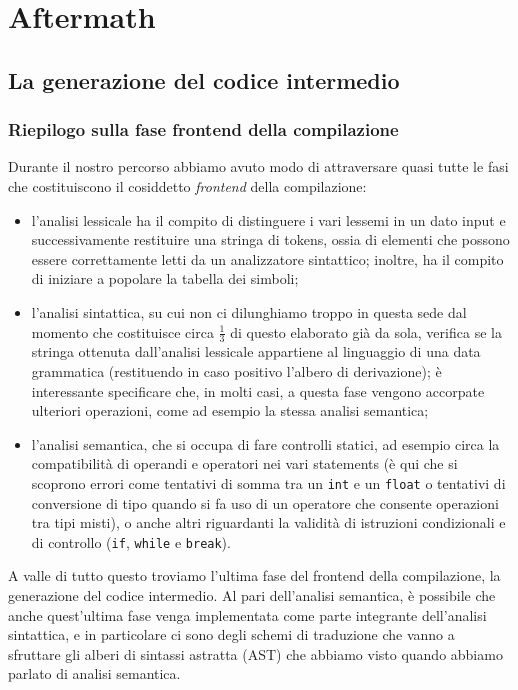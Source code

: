 \documentclass[class=book, crop=false, oneside, 12pt]{standalone}
\begin{document}
\part{Aftermath}
\chapter{La generazione del codice intermedio}
\section{Riepilogo sulla fase frontend della compilazione}
Durante il nostro percorso abbiamo avuto modo di attraversare quasi tutte le fasi che costituiscono il cosiddetto \emph{frontend} della compilazione:
\begin{itemize}
    \item l'analisi lessicale ha il compito di distinguere i vari lessemi in un dato input e successivamente restituire una stringa di tokens, ossia di elementi che possono essere correttamente letti da un analizzatore sintattico; inoltre, ha il compito di iniziare a popolare la tabella dei simboli;
    \item l'analisi sintattica, su cui non ci dilunghiamo troppo in questa sede dal momento che costituisce circa \(\frac{1}{3}\) di questo elaborato già da sola, verifica se la stringa ottenuta dall'analisi lessicale appartiene al linguaggio di una data grammatica (restituendo in caso positivo l'albero di derivazione); è interessante specificare che, in molti casi, a questa fase vengono accorpate ulteriori operazioni, come ad esempio la stessa analisi semantica;
    \item l'analisi semantica, che si occupa di fare controlli statici, ad esempio circa la compatibilità di operandi e operatori nei vari statements (è qui che si scoprono errori come tentativi di somma tra un \texttt{int} e un \texttt{float} o tentativi di conversione di tipo quando si fa uso di un operatore che consente operazioni tra tipi misti), o anche altri riguardanti la validità di istruzioni condizionali e di controllo (\texttt{if}, \texttt{while} e \texttt{break}).
\end{itemize}
A valle di tutto questo troviamo l'ultima fase del frontend della compilazione, la generazione del codice intermedio. Al pari dell'analisi semantica, è possibile che anche quest'ultima fase venga implementata come parte integrante dell'analisi sintattica, e in particolare ci sono degli schemi di traduzione che vanno a sfruttare gli alberi di sintassi astratta (AST) che abbiamo visto quando abbiamo parlato di analisi semantica.
\end{document}
